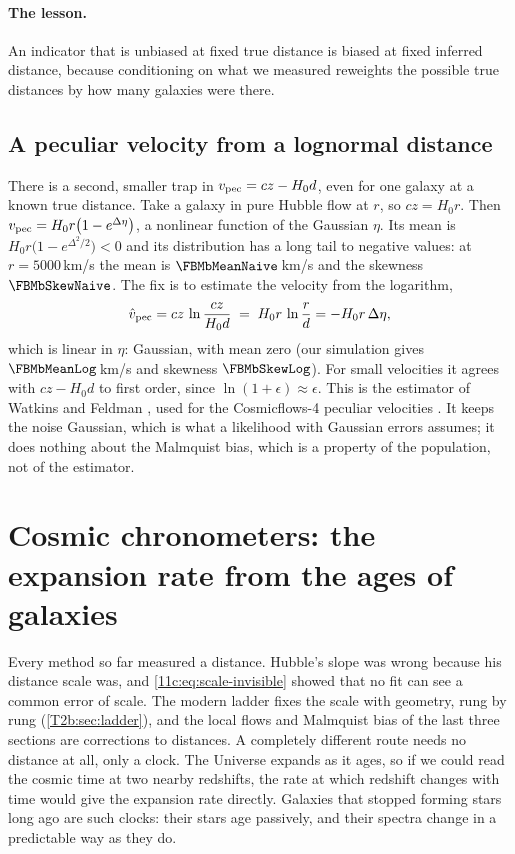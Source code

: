 \paragraph{The lesson.} An indicator that is unbiased at fixed true distance is
biased at fixed inferred distance, because conditioning on what we measured
reweights the possible true distances by how many galaxies were there.

\subsection{A peculiar velocity from a lognormal distance}
\label{11c:sec:log-estimator}

There is a second, smaller trap in $v_{\rm pec}=cz-H_0d$, even for one galaxy at a known
true distance. Take a galaxy in pure Hubble flow at $r$, so $cz=H_0r$. Then
$v_{\rm pec}=H_0r\bigl(1-e^{\Delta\eta}\bigr)$, a nonlinear function of the Gaussian $\eta$. Its
mean is $H_0r\bigl(1-e^{\Delta^2/2}\bigr)<0$ and its distribution has a long tail to
negative values: at $r=5000$\,km/s the mean is $\FBMbMeanNaive$\,km/s and the skewness
$\FBMbSkewNaive$. The fix is to estimate the velocity from the logarithm,
\[
  \hat v_{\rm pec}=cz\,\ln\frac{cz}{H_0d}
  \;=\;H_0r\,\ln\frac{r}{d}=-H_0r\,\Delta\eta ,
\]
which is linear in $\eta$: Gaussian, with mean zero (our simulation gives
$\FBMbMeanLog$\,km/s and skewness $\FBMbSkewLog$). For small velocities it agrees with
$cz-H_0d$ to first order, since $\ln(1+\epsilon)\approx\epsilon$. This is the estimator of
Watkins and Feldman \cite{WatkinsFeldman2015}, used for the Cosmicflows-4 peculiar
velocities \cite{Tully2023CF4}. It keeps the noise Gaussian, which is what a
likelihood with Gaussian errors assumes; it does nothing about the Malmquist bias,
which is a property of the population, not of the estimator.
\section{Cosmic chronometers: the expansion rate from the ages of galaxies}
\label{11c:sec:cc}

Every method so far measured a distance. Hubble's slope was wrong because his
distance scale was, and \eqref{11c:eq:scale-invisible} showed that no fit can see a
common error of scale. The modern ladder fixes the scale with geometry, rung by rung
(\cref{T2b:sec:ladder}), and the local flows and Malmquist bias of the last three
sections are corrections to distances. A completely different route needs no
distance at all, only a clock. The Universe expands as it ages, so if we could read
the cosmic time at two nearby redshifts, the rate at which redshift changes with time
would give the expansion rate directly. Galaxies that stopped forming stars long
ago are such clocks: their stars age passively, and their spectra change in a
predictable way as they do.

